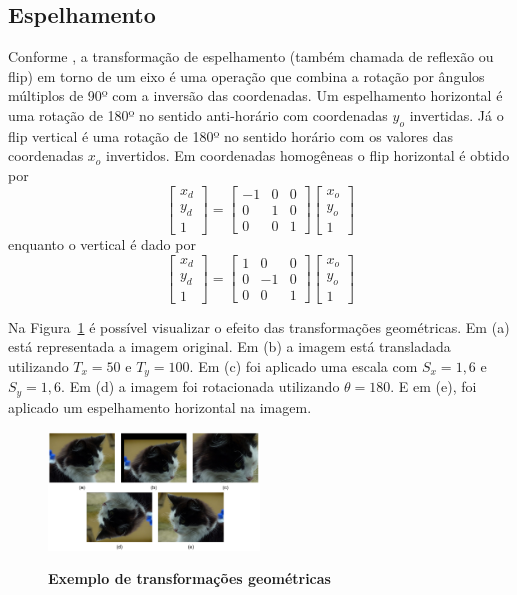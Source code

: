 \documentclass[12pt,oneside,a4paper,english,french,spanish,brazil,]{abntex2}
\begin{document}
\subsection{Espelhamento}

Conforme \citet{conci:2003}, a transformação de espelhamento (também chamada de reflexão ou flip) em torno de um eixo é uma operação que combina a rotação por ângulos múltiplos de 90º com a inversão das coordenadas. Um espelhamento horizontal é uma rotação de 180º no sentido anti-horário com coordenadas \(y_o\) invertidas. Já o flip vertical é uma rotação de 180º no sentido horário com os valores das coordenadas \(x_o\) invertidos.
	Em coordenadas homogêneas o flip horizontal é obtido por
\[
\begin{bmatrix}
x_d\\ 
y_d\\ 
1
\end{bmatrix}
=
\begin{bmatrix}
-1 & 0 & 0\\ 
0 & 1 & 0\\ 
0 & 0 & 1
\end{bmatrix}
\begin{bmatrix}
x_o\\ 
y_o\\ 
1
\end{bmatrix}
\]
enquanto o vertical é dado por
\[
\begin{bmatrix}
x_d\\ 
y_d\\ 
1
\end{bmatrix}
=
\begin{bmatrix}
1 & 0 & 0\\ 
0 & -1 & 0\\ 
0 & 0 & 1
\end{bmatrix}
\begin{bmatrix}
x_o\\ 
y_o\\ 
1
\end{bmatrix}
\]

Na Figura~\ref{fig:PDI_Transformacoes_Geometricas} é possível visualizar o efeito das transformações geométricas. Em (a) está representada a imagem original. Em (b) a imagem está transladada utilizando \(T_x=50\) e \(T_y=100\). Em (c) foi aplicado uma escala com \(S_x=1,6\) e \(S_y=1,6\). Em (d) a imagem foi rotacionada utilizando \(\theta=180\). E em (e), foi aplicado um espelhamento horizontal na imagem.

\begin{figure}[ht]
\centering
\caption{\textbf{Exemplo de transformações geométricas}}
\includegraphics[width=0.5\textwidth]{imagens/PDI_Transformacoes_Geometricas.pdf}
\sourceAuthor
\label{fig:PDI_Transformacoes_Geometricas}
\end{figure}
\end{document}
